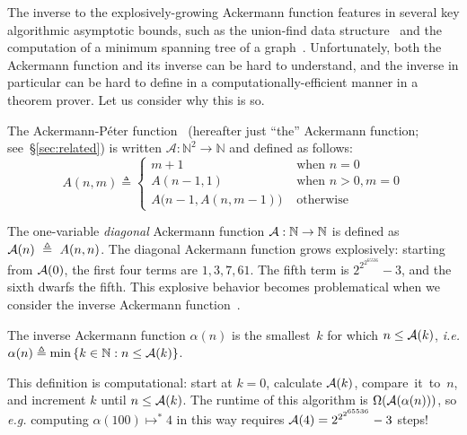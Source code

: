 The inverse to the explosively-growing Ackermann function 
features in several key algorithmic asymptotic
bounds, such as the union-find data structure~\cite{tarjan} and 
the computation of a minimum spanning
tree of a graph~\cite{chazelle}.  Unfortunately, both the Ackermann 
function and its inverse
can be hard to understand, and the inverse in particular can be hard to define in a computationally-efficient manner in a theorem prover.  Let us consider why this
is so.
\begin{defn} \label{defn: ack} 
The Ackermann-P\'eter function~\cite{peter} (hereafter just 
``the'' \linebreak[4] Ackermann function; see~\S\ref{sec:related}) is
written $\mathcal{A} : \mathbb{N}^2 \to \mathbb{N}$ and defined as follows:
\begin{equation}
\label{eq:ackermann}
A(n, m) \triangleq \begin{cases}
m + 1 & \text{ when } n = 0 \\
A(n-1, 1) & \text{ when } n > 0, m = 0 \\
A\big(n-1, A(n, m-1)\big) & \text{ otherwise}
\end{cases}
\end{equation}
\end{defn}

The one-variable \emph{diagonal} Ackermann function $\mathcal{A} : \mathbb{N} \to \mathbb{N}$ is defined as $\mathcal{A}(n)~\triangleq~A(n, n)$.	
The diagonal Ackermann function grows explosively: starting from $\mathcal{A}(0)$, the first four terms are $1, 3, 7, 61$.  The fifth term is $2^{2^{2^{65536}}}-3$, and the sixth dwarfs the fifth.
This explosive behavior becomes problematical when we consider
the inverse Ackermann function~\cite{chazelle,tarjan}.
\begin{defn} \label{defn: inv_ack}
The inverse Ackermann function $\alpha(n)$ is the smallest~$k$ for 
\linebreak which $n \le \mathcal{A}(k)$, \emph{i.e.} $\alpha(n) \triangleq \min\left\{k\in \mathbb{N} : n \le \mathcal{A}(k)\right\}$.
\end{defn}
This definition is computational: start at $k=0$, calculate $\mathcal{A}(k)$, 
compare~it~to~$n$, and increment $k$ until $n \le \mathcal{A}(k)$. 
The runtime of this algorithm is $\Omega(\mathcal{A}(\alpha(n)))$,
so \emph{e.g.} computing $\alpha(100) \mapsto^{*} 4$ in this way requires 
$\mathcal{A}(4) = 2^{2^{2^{65536}}}-3$ steps!

